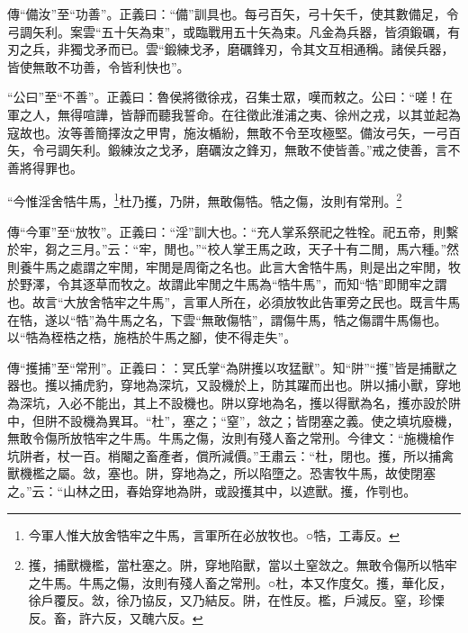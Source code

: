 {\noindent\zhuan{}\fzbyks 傳“備汝”至“功善”。正義曰：“備”訓具也。每弓百矢，弓十矢千，使其數備足，令弓調矢利。案雲“五十矢為束”，或臨戰用五十矢為束。凡金為兵器，皆須鍛礪，有刃之兵，非獨戈矛而已。雲“鍛練戈矛，磨礪鋒刃，令其文互相通稱。諸侯兵器，皆使無敢不功善，令皆利快也”。 \par}

{\noindent\shu{}\fzkt “公曰”至“不善”。正義曰：魯侯將徵徐戎，召集士眾，嘆而敕之。公曰：“嗟！在軍之人，無得喧譁，皆靜而聽我誓命。在往徵此淮浦之夷、徐州之戎，以其並起為寇故也。汝等善簡擇汝之甲冑，施汝楯紛，無敢不令至攻極堅。備汝弓矢，一弓百矢，令弓調矢利。鍛練汝之戈矛，磨礪汝之鋒刃，無敢不使皆善。”戒之使善，言不善將得罪也。 \par}

“今惟淫舍牿牛馬，\footnote{今軍人惟大放舍牿牢之牛馬，言軍所在必放牧也。○牿，工毒反。}杜乃擭，乃阱，無敢傷牿。牿之傷，汝則有常刑。\footnote{擭，捕獸機檻，當杜塞之。阱，穿地陷獸，當以土窒敜之。無敢令傷所以牿牢之牛馬。牛馬之傷，汝則有殘人畜之常刑。○杜，本又作度攵。擭，華化反，徐戶覆反。敜，徐乃協反，又乃結反。阱，在性反。檻，戶減反。窒，珍慄反。畜，許六反，又醜六反。}


{\noindent\zhuan{}\fzbyks 傳“今軍”至“放牧”。正義曰：“淫”訓大也。：“充人掌系祭祀之牲牷。祀五帝，則繫於牢，芻之三月。”云：“牢，閒也。”“校人掌王馬之政，天子十有二閒，馬六種。”然則養牛馬之處謂之牢閒，牢閒是周衛之名也。此言大舍牿牛馬，則是出之牢閒，牧於野澤，令其逐草而牧之。故謂此牢閒之牛馬為“牿牛馬”，而知“牿”即閒牢之謂也。故言“大放舍牿牢之牛馬”，言軍人所在，必須放牧此告軍旁之民也。既言牛馬在牿，遂以“牿”為牛馬之名，下雲“無敢傷牿”，謂傷牛馬，牿之傷謂牛馬傷也。以“牿為桎梏之梏，施梏於牛馬之腳，使不得走失”。 \par}

{\noindent\zhuan{}\fzbyks 傳“擭捕”至“常刑”。正義曰：：冥氏掌“為阱擭以攻猛獸”。知“阱”“擭”皆是捕獸之器也。擭以捕虎豹，穿地為深坑，又設機於上，防其躍而出也。阱以捕小獸，穿地為深坑，入必不能出，其上不設機也。阱以穿地為名，擭以得獸為名，擭亦設於阱中，但阱不設機為異耳。“杜”，塞之；“窒”，敜之；皆閉塞之義。使之填坑廢機，無敢令傷所放牿牢之牛馬。牛馬之傷，汝則有殘人畜之常刑。今律文：“施機槍作坑阱者，杖一百。梢閹之畜產者，償所減價。”王肅云：“杜，閉也。擭，所以捕禽獸機檻之屬。敜，塞也。阱，穿地為之，所以陷墮之。恐害牧牛馬，故使閉塞之。”云：“山林之田，春始穿地為阱，或設擭其中，以遮獸。擭，作㓵也。 \par}

